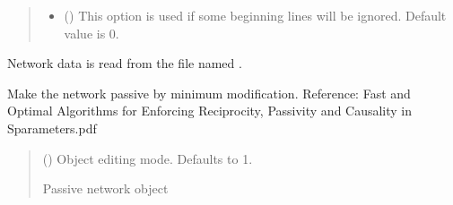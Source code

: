 \documentclass[letterpaper,10pt,english]{sphinxmanual}
\begin{document}
\begin{fulllineitems}
\begin{fulllineitems}
\begin{quote}
\begin{description}
\begin{itemize}
\item {}
\sphinxAtStartPar
{} (\sphinxstyleliteralemphasis{\sphinxupquote{, }}) \textendash{} This option is used if some beginning lines will be ignored. Default value is 0.

\end{itemize}

\end{description}\end{quote}

\end{fulllineitems}


\begin{fulllineitems}
\label{\detokenize{touchstone:touchstone.spfile.read_file_again}}
\pysigstartsignatures
{}
\pysigstopsignatures
\sphinxAtStartPar
Network data is read from the file named .

\end{fulllineitems}


\begin{fulllineitems}
\label{\detokenize{touchstone:touchstone.spfile.restore_passivity}}
\pysigstartsignatures
{}
\pysigstopsignatures
\sphinxAtStartPar
Make the network passive by minimum modification.
Reference: Fast and Optimal Algorithms for Enforcing Reciprocity, Passivity and Causality in S\sphinxhyphen{}parameters.pdf
\begin{quote}\begin{description}
\sphinxAtStartPar
{} (\sphinxstyleliteralemphasis{\sphinxupquote{, }}) \textendash{} Object editing mode. Defaults to \sphinxhyphen{}1.

\sphinxAtStartPar
Passive network object


\end{description}
\end{quote}
\end{fulllineitems}
\end{fulllineitems}
\end{document}

